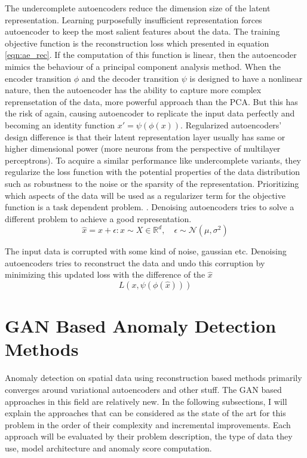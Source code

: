 The undercomplete autoencoders reduce the dimension size of the latent representation. Learning
purposefully insufficient representation forces autoencoder to keep the most salient features about
the data. The training objective function is the reconstruction loss which presented in equation
\ref{eqn:ae_rec}. If the computation of this function is linear, then the autoencoder mimics the
behaviour of a principal component analysis method. When the encoder transition $\phi$ and the
decoder transition $\psi$ is designed to have a nonlinear nature, then the autoencoder has the
ability to capture more complex reprensetation of the data, more powerful approach than the PCA. But
this has the risk of again, causing autoencoder to replicate the input data perfectly and becoming
an identity function $x' = \psi(\phi(x))$. Regularized autoencoders' design difference is that their
latent representation layer usually has same or higher dimensional power (more neurons from the
perspective of multilayer perceptrons). To acquire a similar performance like undercomplete
variants, they regularize the loss function  with the potential properties of the data distribution
such as robustness to the noise or the sparsity of the representation. Prioritizing which aspects of
the data will be used as a regularizer term for the objective function is a task dependent problem.
\cite{Goodfellow-et-al-2016}. Denoising autoencoders tries to solve a different problem to achieve a
good representation. 
$$
\hat{x} = x + \epsilon : x \sim X \in \mathbb{R}^d ,\quad \epsilon \sim \mathcal{N}(\mu, \sigma^2)
$$

The input data is corrupted with some kind of noise, gaussian etc. Denoising autoencoders tries to
reconstruct the data and undo this corruption by minimizing this updated loss with the difference of
the $\hat{x}$
$$
L(x, \psi(\phi(\hat{x})))
$$

\section{GAN Based Anomaly Detection Methods}

Anomaly detection on spatial data using reconstruction based methods primarily converges around
variational autoencoders and other stuff. The GAN based approaches in this field are relatively new.
In the following subsections, I will explain the approaches that can be considered as the state of
the art for this problem in the order of their complexity and incremental improvements. Each
approach will be evaluated by their problem description, the type of data they use, model
architecture and anomaly score computation. 

